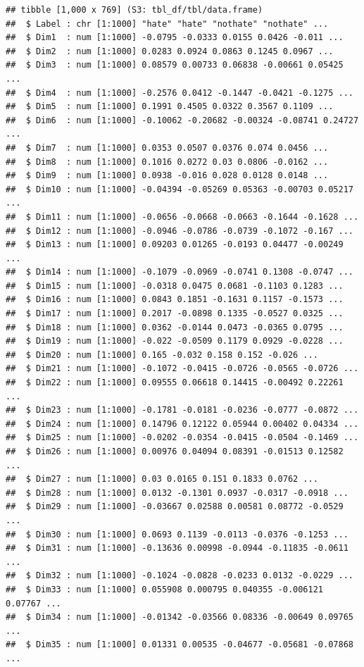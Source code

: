 \documentclass[
  english,
  man]{apa6}
\begin{document}
\begin{verbatim}
## tibble [1,000 x 769] (S3: tbl_df/tbl/data.frame)
##  $ Label : chr [1:1000] "hate" "hate" "nothate" "nothate" ...
##  $ Dim1  : num [1:1000] -0.0795 -0.0333 0.0155 0.0426 -0.011 ...
##  $ Dim2  : num [1:1000] 0.0283 0.0924 0.0863 0.1245 0.0967 ...
##  $ Dim3  : num [1:1000] 0.08579 0.00733 0.06838 -0.00661 0.05425 ...
##  $ Dim4  : num [1:1000] -0.2576 0.0412 -0.1447 -0.0421 -0.1275 ...
##  $ Dim5  : num [1:1000] 0.1991 0.4505 0.0322 0.3567 0.1109 ...
##  $ Dim6  : num [1:1000] -0.10062 -0.20682 -0.00324 -0.08741 0.24727 ...
##  $ Dim7  : num [1:1000] 0.0353 0.0507 0.0376 0.074 0.0456 ...
##  $ Dim8  : num [1:1000] 0.1016 0.0272 0.03 0.0806 -0.0162 ...
##  $ Dim9  : num [1:1000] 0.0938 -0.016 0.028 0.0128 0.0148 ...
##  $ Dim10 : num [1:1000] -0.04394 -0.05269 0.05363 -0.00703 0.05217 ...
##  $ Dim11 : num [1:1000] -0.0656 -0.0668 -0.0663 -0.1644 -0.1628 ...
##  $ Dim12 : num [1:1000] -0.0946 -0.0786 -0.0739 -0.1072 -0.167 ...
##  $ Dim13 : num [1:1000] 0.09203 0.01265 -0.0193 0.04477 -0.00249 ...
##  $ Dim14 : num [1:1000] -0.1079 -0.0969 -0.0741 0.1308 -0.0747 ...
##  $ Dim15 : num [1:1000] -0.0318 0.0475 0.0681 -0.1103 0.1283 ...
##  $ Dim16 : num [1:1000] 0.0843 0.1851 -0.1631 0.1157 -0.1573 ...
##  $ Dim17 : num [1:1000] 0.2017 -0.0898 0.1335 -0.0527 0.0325 ...
##  $ Dim18 : num [1:1000] 0.0362 -0.0144 0.0473 -0.0365 0.0795 ...
##  $ Dim19 : num [1:1000] -0.022 -0.0509 0.1179 0.0929 -0.0228 ...
##  $ Dim20 : num [1:1000] 0.165 -0.032 0.158 0.152 -0.026 ...
##  $ Dim21 : num [1:1000] -0.1072 -0.0415 -0.0726 -0.0565 -0.0726 ...
##  $ Dim22 : num [1:1000] 0.09555 0.06618 0.14415 -0.00492 0.22261 ...
##  $ Dim23 : num [1:1000] -0.1781 -0.0181 -0.0236 -0.0777 -0.0872 ...
##  $ Dim24 : num [1:1000] 0.14796 0.12122 0.05944 0.00402 0.04334 ...
##  $ Dim25 : num [1:1000] -0.0202 -0.0354 -0.0415 -0.0504 -0.1469 ...
##  $ Dim26 : num [1:1000] 0.00976 0.04094 0.08391 -0.01513 0.12582 ...
##  $ Dim27 : num [1:1000] 0.03 0.0165 0.151 0.1833 0.0762 ...
##  $ Dim28 : num [1:1000] 0.0132 -0.1301 0.0937 -0.0317 -0.0918 ...
##  $ Dim29 : num [1:1000] -0.03667 0.02588 0.00581 0.08772 -0.0529 ...
##  $ Dim30 : num [1:1000] 0.0693 0.1139 -0.0113 -0.0376 -0.1253 ...
##  $ Dim31 : num [1:1000] -0.13636 0.00998 -0.0944 -0.11835 -0.0611 ...
##  $ Dim32 : num [1:1000] -0.1024 -0.0828 -0.0233 0.0132 -0.0229 ...
##  $ Dim33 : num [1:1000] 0.055908 0.000795 0.040355 -0.006121 0.07767 ...
##  $ Dim34 : num [1:1000] -0.01342 -0.03566 0.08336 -0.00649 0.09765 ...
##  $ Dim35 : num [1:1000] 0.01331 0.00535 -0.04677 -0.05681 -0.07868 ...

\end{verbatim}
\end{document}
